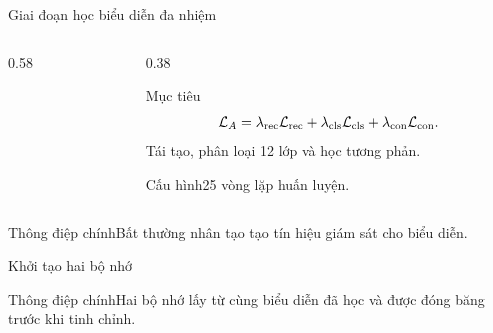 \documentclass[aspectratio=169]{beamer}
\newcommand{\takeaway}[1]{\begin{alertblock}{Thông điệp chính}#1\end{alertblock}}
\begin{document}
\begin{frame}{Giai đoạn học biểu diễn đa nhiệm}
  \begin{columns}[T,onlytextwidth]
    \begin{column}{0.58\textwidth}\end{column}
    \begin{column}{0.38\textwidth}
      \begin{block}{Mục tiêu}
        \[
        \mathcal L_A=\lambda_{\rm rec}\mathcal L_{\rm rec}+\lambda_{\rm cls}\mathcal L_{\rm cls}+\lambda_{\rm con}\mathcal L_{\rm con}.
        \]
        Tái tạo, phân loại 12 lớp và học tương phản.
      \end{block}
      \begin{exampleblock}{Cấu hình}25 vòng lặp huấn luyện.\end{exampleblock}
    \end{column}
  \end{columns}
  \takeaway{Bất thường nhân tạo tạo tín hiệu giám sát cho biểu diễn.}
\end{frame}

\begin{frame}{Khởi tạo hai bộ nhớ}
  \begin{center}
  \end{center}
  \takeaway{Hai bộ nhớ lấy từ cùng biểu diễn đã học và được đóng băng trước khi tinh chỉnh.}
\end{frame}
\end{document}

